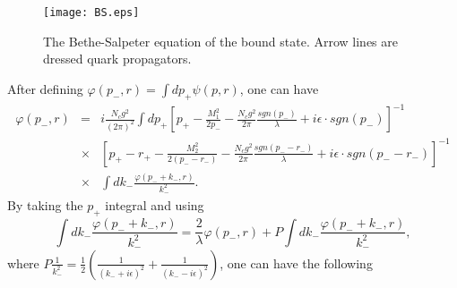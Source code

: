 \documentclass[8pt]{beamer}
\begin{document}
\begin{frame}
	\begin{figure}[hbt]
		\begin{center}
			\texttt{[image: BS.eps]}\\
			\caption{The Bethe-Salpeter equation of the bound state. Arrow lines are dressed quark propagators.}\label{BSequation}
		\end{center}
	\end{figure}
	After defining $\varphi(p_{-},r)=\int dp_{+}\psi(p,r)$, one can have
	\small
	\begin{eqnarray}
		\varphi(p_{-},r)&=&i\frac{N_c g^2}{(2\pi)^2}\int dp_{+}
		[p_{+}-\frac{M_1^2}{2p_{-}}-\frac{N_c
			g^2}{2\pi}\frac{sgn(p_{-})}{\lambda}+i\epsilon\cdot sgn(p_{-})]^{-1}\nonumber\\
		&\times&[p_{+}-r_{+}-\frac{M_2^2}{2(p_{-}-r_{-})}-\frac{N_c
			g^2}{2\pi}\frac{sgn(p_{-}-r_{-})}{\lambda}+i\epsilon\cdot sgn(p_{-}-r_{-})]^{-1}\nonumber\\
		&\times&\int dk_{-}\frac{\varphi(p_{-}+k_{-},r)}{k_{-}^2}.
	\end{eqnarray}
	\normalsize
	By taking the $p_{+}$ integral and using
	\begin{equation}
		\int
		dk_{-}\frac{\varphi(p_{-}+k_{-},r)}{k_{-}^2}=\frac{2}{\lambda}\varphi(p_{-},r)
		+P\int dk_{-}\frac{\varphi(p_{-}+k_{-},r)}{k_{-}^2},
	\end{equation}
	where
	$P\frac{1}{k_{-}^2}=\frac{1}{2}(\frac{1}{(k_{-}+i\epsilon)^2}+\frac{1}{(k_{-}-i\epsilon)^2})$,
	one can have the following

\end{frame}
\end{document}
